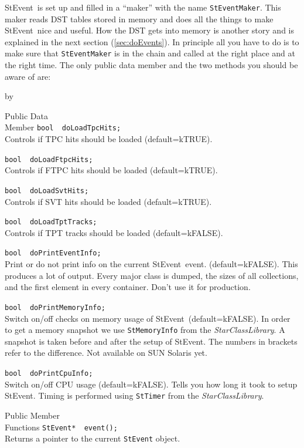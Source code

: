 \documentclass[twoside]{article}
\newcommand{\name}[1]{\textsl{#1}}%
\newcommand{\StEvent}{\textsf{StEvent}}
\newcommand{\entrylabel}[1]{\mbox{\textbf{{#1}}}\hfil}%
\newenvironment{entry}
{\begin{list}{}%
    {\renewcommand{\makelabel}{\entrylabel}%
     \setlength{\labelwidth}{90pt}%
     \setlength{\leftmargin}{\labelwidth}
     \advance\leftmargin by \labelsep%
      }%
    }%
  {\end{list}}
\newcommand{\Entrylabel}[1]%
{\raisebox{0pt}[1ex][0pt]{\makebox[\labelwidth][l]%
    {\parbox[t]{\labelwidth}{\hspace{0pt}\textbf{{#1}}}}}}
\newenvironment{Entry}%
{\renewcommand{\entrylabel}{\Entrylabel}\begin{entry}}%
  {\end{entry}}
\begin{document}
\StEvent\ is set up and filled in a ``maker'' with the name
\texttt{StEventMaker}.  This maker reads DST tables stored in memory
and does all the things to make \StEvent\ nice and useful. How the DST
gets into memory is another story and is explained in the next section
(\ref{sec:doEvents}).  In principle all you have to do is to make sure
that \texttt{StEventMaker} is in the chain and called at the right
place and at the right time.  The only public data member and the two
methods you should be aware of are:
\begin{Entry}
    
\item[Public Data\\ Member]
    \verb+bool  doLoadTpcHits;+\\
    Controls if TPC hits should be loaded (default=kTRUE).
    
    \verb+bool  doLoadFtpcHits;+\\
    Controls if FTPC hits should be loaded (default=kTRUE).
    
    \verb+bool  doLoadSvtHits; +\\
    Controls if SVT hits should be loaded (default=kTRUE).
                              
    \verb+bool  doLoadTptTracks;+\\
    Controls if TPT tracks should be loaded (default=kFALSE).
    
    \verb+bool  doPrintEventInfo;+\\
    Print or do not print info on the current \StEvent\ event.
    (default=kFALSE).  This produces a lot of output. Every major
    class is dumped, the sizes of all collections, and the first
    element in every container. Don't use it for production.
    
    \verb+bool  doPrintMemoryInfo;+\\
    Switch on/off checks on memory usage of \StEvent\
    (default=kFALSE).  In order to get a memory snapshot we use
    \texttt{StMemoryInfo} from the \name{StarClassLibrary}.  A
    snapshot is taken before and after the setup of \StEvent.  The
    numbers in brackets refer to the difference. Not available on SUN
    Solaris yet.
    
    \verb+bool  doPrintCpuInfo;+\\
    Switch on/off CPU usage (default=kFALSE). Tells you how long it
    took to setup \StEvent. Timing is performed using \texttt{StTimer}
    from the \name{StarClassLibrary}.
    
\item[Public Member\\ Functions]
    \verb+StEvent*  event();+\\
    Returns a pointer to the current \texttt{StEvent} object.
\end{Entry}
\end{document}

